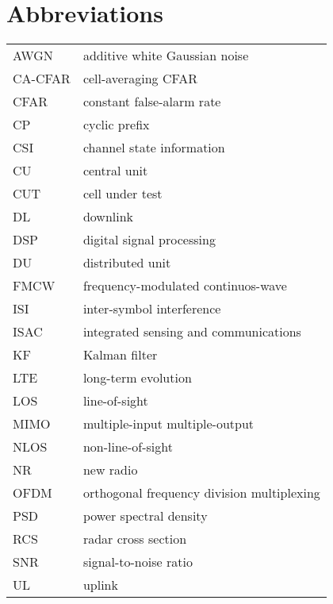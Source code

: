 \chapter*{Abbreviations} %

\begin{table}[H]
    \begin{tabular}{ll}
    	AWGN & additive white Gaussian noise \\[2px]
    	CA-CFAR & cell-averaging CFAR \\[2px]
    	CFAR & constant false-alarm rate \\[2px]
    	CP & cyclic prefix \\[2px]
    	CSI & channel state information \\[2px]
    	CU & central unit  \\[2px]
    	CUT & cell under test \\[2px]
    	DL & downlink \\[2px]
    	DSP & digital signal processing \\[2px]
    	DU & distributed unit \\[2px]
    	FMCW & frequency-modulated continuos-wave \\[2px]
    	ISI & inter-symbol interference \\[2px]
    	ISAC & integrated sensing and communications \\[2px]
    	KF & Kalman filter \\[2px]
        LTE & long-term evolution \\[2px]
        LOS & line-of-sight \\[2px]
        MIMO & multiple-input multiple-output \\[2px]
        NLOS & non-line-of-sight \\[2px]
        NR & new radio\\[2px]
        OFDM & orthogonal frequency division multiplexing \\[2px]
        PSD & power spectral density  \\[2px]
        RCS & radar cross section \\[2px]
        SNR & signal-to-noise ratio \\[2px]
        UL & uplink \\[2px]
        
        
    \end{tabular}
\end{table}